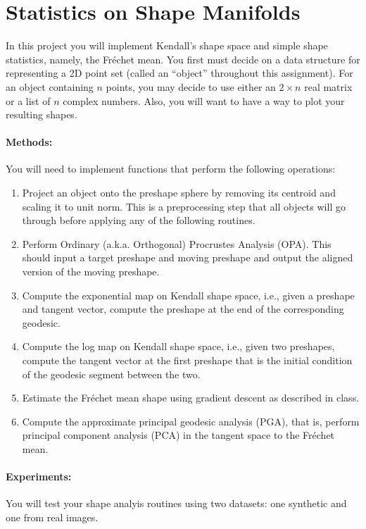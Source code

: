 \documentclass[11pt]{article}
\begin{document}
\section{Statistics on Shape Manifolds}
In this project you will implement Kendall's shape space and simple shape
statistics, namely, the Fr\'{e}chet mean. You first must decide on a data
structure for representing a 2D point set (called an ``object'' throughout this
assignment).  For an object containing $n$ points, you may decide to use either
an $2 \times n$ real matrix or a list of $n$ complex numbers. Also, you will
want to have a way to plot your resulting shapes.

\paragraph{Methods:} You will need to implement functions that perform the
following operations:

\begin{enumerate}
\item Project an object onto the preshape sphere by removing its centroid
and scaling it to unit norm. This is a preprocessing step that all objects
will go through before applying any of the following routines.

\item Perform Ordinary (a.k.a. Orthogonal) Procrustes Analysis (OPA). This
should input a target preshape and moving preshape and output the aligned
version of the moving preshape.

\item Compute the exponential map on Kendall shape space, i.e., given a preshape
and tangent vector, compute the preshape at the end of the corresponding
geodesic.

\item Compute the log map on Kendall shape space, i.e., given two preshapes,
compute the tangent vector at the first preshape that is the initial condition
of the geodesic segment between the two.

\item Estimate the Fr\'{e}chet mean shape using gradient descent as described in
  class.

\item Compute the approximate principal geodesic analysis (PGA), that is,
perform principal component analysis (PCA) in the tangent space to the
Fr\'{e}chet mean.
\end{enumerate}

\paragraph{Experiments:} You will test your shape analyis routines using two
datasets: one synthetic and one from real images.
\end{document}
